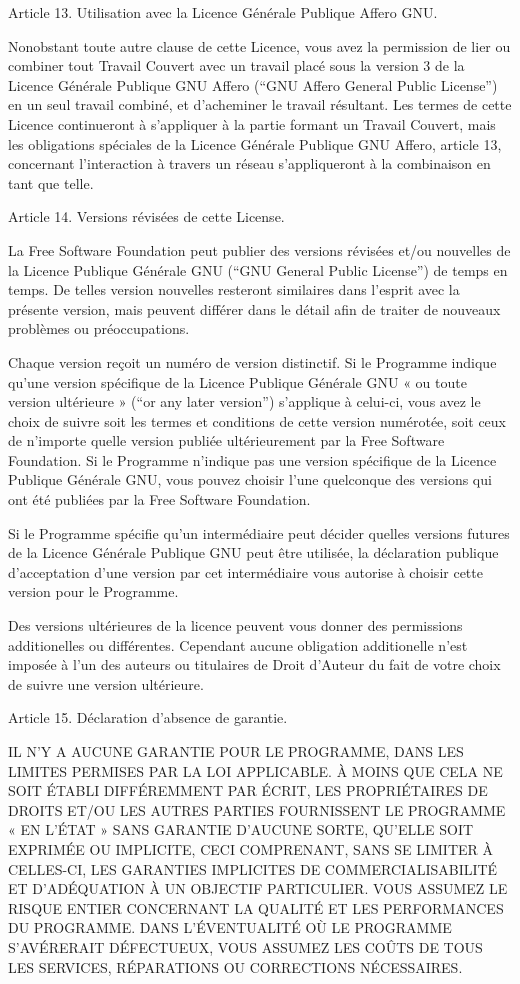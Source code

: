 {Article 13. Utilisation avec la Licence Générale Publique Affero GNU.

Nonobstant toute autre clause de cette Licence, vous avez la permission
de lier ou combiner tout Travail Couvert avec un travail placé sous la
version 3 de la Licence Générale Publique GNU Affero (“GNU Affero
General Public License”) en un seul travail combiné, et d’acheminer le
travail résultant. Les termes de cette Licence continueront à
s’appliquer à la partie formant un Travail Couvert, mais les
obligations spéciales de la Licence Générale Publique GNU Affero,
article 13, concernant l’interaction à travers un réseau s’appliqueront
à la combinaison en tant que telle.


Article 14. Versions révisées de cette License.

La Free Software Foundation peut publier des versions révisées et/ou
nouvelles de la Licence Publique Générale GNU (“GNU General Public
License”) de temps en temps. De telles version nouvelles resteront
similaires dans l’esprit avec la présente version, mais peuvent
différer dans le détail afin de traiter de nouveaux problèmes ou
préoccupations.

Chaque version reçoit un numéro de version distinctif. Si le Programme
indique qu’une version spécifique de la Licence Publique Générale GNU
« ou toute version ultérieure » (“or any later version”) s’applique à
celui-ci, vous avez le choix de suivre soit les termes et conditions de
cette version numérotée, soit ceux de n’importe quelle version publiée
ultérieurement par la Free Software Foundation. Si le Programme
n’indique pas une version spécifique de la Licence Publique Générale
GNU, vous pouvez choisir l’une quelconque des versions qui ont été
publiées par la Free Software Foundation.

Si le Programme spécifie qu’un intermédiaire peut décider quelles
versions futures de la Licence Générale Publique GNU peut être
utilisée, la déclaration publique d’acceptation d’une version par cet
intermédiaire vous autorise à choisir cette version pour le Programme.

Des versions ultérieures de la licence peuvent vous donner des
permissions additionelles ou différentes. Cependant aucune obligation
additionelle n’est imposée à l’un des auteurs ou titulaires de Droit
d’Auteur du fait de votre choix de suivre une version ultérieure.


Article 15. Déclaration d’absence de garantie.

IL N’Y A AUCUNE GARANTIE POUR LE PROGRAMME, DANS LES LIMITES PERMISES
PAR LA LOI APPLICABLE. À MOINS QUE CELA NE SOIT ÉTABLI DIFFÉREMMENT PAR
ÉCRIT, LES PROPRIÉTAIRES DE DROITS ET/OU LES AUTRES PARTIES FOURNISSENT
LE PROGRAMME « EN L’ÉTAT » SANS GARANTIE D’AUCUNE SORTE, QU’ELLE SOIT
EXPRIMÉE OU IMPLICITE, CECI COMPRENANT, SANS SE LIMITER À CELLES-CI,
LES GARANTIES IMPLICITES DE COMMERCIALISABILITÉ ET D’ADÉQUATION À UN
OBJECTIF PARTICULIER. VOUS ASSUMEZ LE RISQUE ENTIER CONCERNANT LA
QUALITÉ ET LES PERFORMANCES DU PROGRAMME. DANS L’ÉVENTUALITÉ OÙ LE
PROGRAMME  S’AVÉRERAIT DÉFECTUEUX, VOUS ASSUMEZ 
LES COÛTS DE TOUS LES SERVICES, RÉPARATIONS OU CORRECTIONS NÉCESSAIRES.


}
